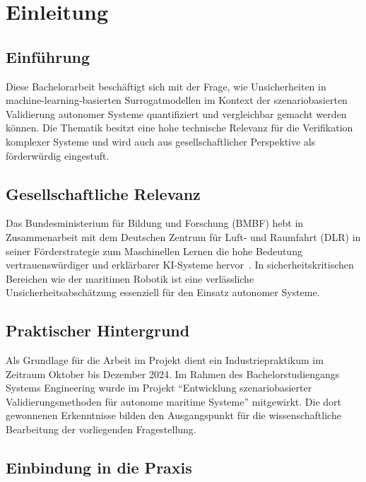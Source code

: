 
\chapter{Einleitung}
\label{chapter:introduction}

\section{Einführung}

Diese Bachelorarbeit beschäftigt sich mit der Frage, wie Unsicherheiten in machine-learning-basierten Surrogatmodellen im Kontext der szenariobasierten Validierung autonomer Systeme quantifiziert und vergleichbar gemacht werden können. Die Thematik besitzt eine hohe technische Relevanz für die Verifikation komplexer Systeme und wird auch aus gesellschaftlicher Perspektive als förderwürdig eingestuft.

\section{Gesellschaftliche Relevanz}

Das Bundesministerium für Bildung und Forschung (BMBF) hebt in Zusammenarbeit mit dem Deutschen Zentrum für Luft- und Raumfahrt (DLR) in seiner Förderstrategie zum Maschinellen Lernen die hohe Bedeutung vertrauenswürdiger und erklärbarer KI-Systeme hervor~\parencite{bmbf2025}. In sicherheitskritischen Bereichen wie der maritimen Robotik ist eine verlässliche Unsicherheitsabschätzung essenziell für den Einsatz autonomer Systeme.

\section{Praktischer Hintergrund}

Als Grundlage für die Arbeit im Projekt dient ein Industriepraktikum im Zeitraum Oktober bis Dezember 2024. Im Rahmen des Bachelorstudiengangs Systems Engineering wurde im Projekt \enquote{Entwicklung szenariobasierter Validierungsmethoden für autonome maritime Systeme} mitgewirkt. Die dort gewonnenen Erkenntnisse bilden den Ausgangspunkt für die wissenschaftliche Bearbeitung der vorliegenden Fragestellung.

\section{Einbindung in die Praxis}

